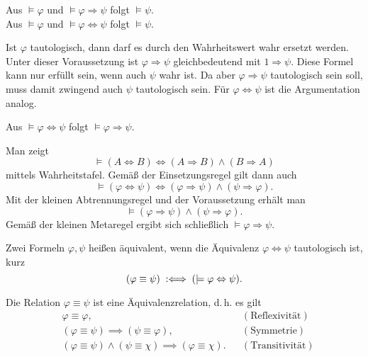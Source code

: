 \begin{Satz}
Aus $\models\varphi$ und $\models\varphi\Rightarrow\psi$
folgt $\models\psi$.\\
Aus $\models\varphi$ und $\models\varphi\Leftrightarrow\psi$
folgt $\models\psi$.
\end{Satz}
Ist $\varphi$ tautologisch, dann darf es durch den Wahrheitswert
wahr ersetzt werden. Unter dieser Voraussetzung ist
$\varphi\Rightarrow\psi$ gleichbedeutend mit $1\Rightarrow\psi$.
Diese Formel kann nur erfüllt sein, wenn auch $\psi$ wahr ist.
Da aber $\varphi\Rightarrow\psi$ tautologisch sein soll,
muss damit zwingend auch $\psi$ tautologisch sein.
Für $\varphi\Leftrightarrow\psi$ ist die Argumentation
analog.\;\qedsymbol

\begin{Satz}
Aus $\models\varphi\Leftrightarrow\psi$
folgt $\models\varphi\Rightarrow\psi$.
\end{Satz}
Man zeigt
\[\models (A\Leftrightarrow B)
\Leftrightarrow (A\Rightarrow B)\land (B\Rightarrow A)\]
mittels Wahrheitstafel. Gemäß der Einsetzungsregel gilt dann auch
\[\models (\varphi\Leftrightarrow\psi)
\Leftrightarrow (\varphi\Rightarrow\psi)\land (\psi\Rightarrow\varphi).\]
Mit der kleinen Abtrennungsregel und der Voraussetzung erhält man
\[\models (\varphi\Rightarrow\psi)\land (\psi\Rightarrow\varphi).\]
Gemäß der kleinen Metaregel ergibt sich schließlich
$\models \varphi\Rightarrow\psi$.\;\qedsymbol

\newpage
\begin{Definition}
Zwei Formeln $\varphi,\psi$ heißen äquivalent, wenn die
Äquivalenz $\varphi\Leftrightarrow\psi$ tautologisch ist, kurz
\[(\varphi\equiv\psi)\;:\Longleftrightarrow\;(\models\varphi\Leftrightarrow\psi).\]
\end{Definition}

\begin{Satz}
Die Relation $\varphi\equiv\psi$ ist eine Äquivalenzrelation, d.\,h.
es gilt
\begin{align}
& \varphi\equiv\varphi, && (\text{Reflexivität})\\
& (\varphi\equiv\psi)\implies (\psi\equiv\varphi), && (\text{Symmetrie})\\
& (\varphi\equiv\psi)\land (\psi\equiv\chi)\implies (\varphi\equiv\chi). && (\text{Transitivität})
\end{align}
\end{Satz}


